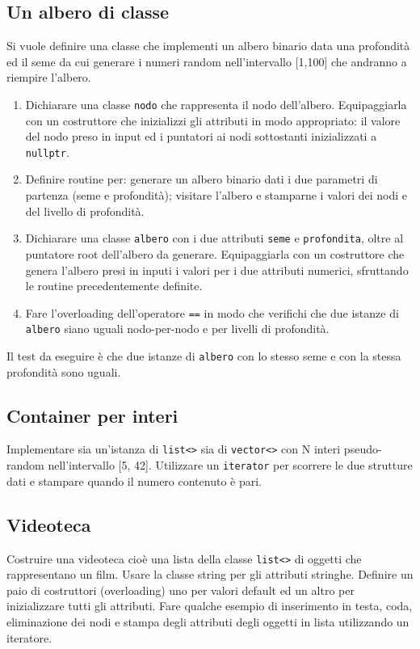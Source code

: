 \documentclass{article}
\begin{document}
\subsection{Un albero di classe}
Si vuole definire una classe che implementi un albero binario data una profondità ed il seme da cui generare i numeri random nell'intervallo [1,100] che andranno a riempire l'albero.
	\begin{enumerate}
	\item Dichiarare una classe \texttt{nodo} che rappresenta il nodo dell'albero. Equipaggiarla con un costruttore che inizializzi gli attributi in modo appropriato: il valore del nodo preso in input ed i puntatori ai nodi sottostanti inizializzati a \texttt{nullptr}.
	\item Definire routine per: generare un albero binario dati i due parametri di partenza (seme e profondità); visitare l'albero e stamparne i valori dei nodi e del livello di profondità.
	\item Dichiarare una classe \texttt{albero} con i due attributi \texttt{seme} e \texttt{profondita}, oltre al puntatore root dell'albero da generare. Equipaggiarla con un costruttore che genera l'albero presi in inputi i valori per i due attributi numerici, sfruttando le routine precedentemente definite.
	\item Fare l'overloading dell'operatore \texttt{==} in modo che verifichi che due istanze di \texttt{albero} siano uguali nodo-per-nodo e per livelli di profondità.
	\end{enumerate}
Il test da eseguire è che due istanze di \texttt{albero} con lo stesso seme e con la stessa profondità sono uguali.
    
    	
\subsection{Container per interi}
Implementare sia un'istanza di \texttt{list<>} sia di \texttt{vector<>} con N interi pseudo-random nell'intervallo [5, 42]. Utilizzare un \texttt{iterator} per scorrere le due strutture dati e stampare quando il numero contenuto è pari.

\subsection{Videoteca}
Costruire una videoteca cioè una lista della classe \texttt{list<>} di oggetti che rappresentano un film. Usare la classe string per gli attributi stringhe. Definire un paio di costruttori (overloading) uno per valori default ed un altro per inizializzare tutti gli attributi. Fare qualche esempio di inserimento in testa, coda, eliminazione dei nodi e stampa degli attributi degli oggetti in lista utilizzando un iteratore.
\end{document}
